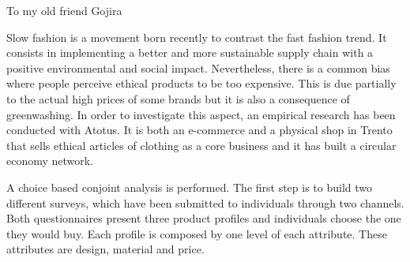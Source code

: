 \documentclass[%
    corpo=11pt,
    twoside, %
    oldstyle,
    autoretitolo,
    greek,
    evenboxes,
]{toptesi}
\begin{document}



  

\frontespizio %


\begin{dedica}
	To my old friend Gojira
	
\end{dedica}
\paginavuota
\sommario 

Slow fashion is a movement born recently to contrast the fast fashion trend. It consists in implementing a better and more sustainable supply chain with a positive environmental and social impact. Nevertheless, there is a common bias where people perceive ethical products to be too expensive. This is due partially to the actual high prices of some brands but it is also a consequence of greenwashing. In order to investigate this aspect, an empirical research has been conducted with Atotus.
It is both an e-commerce and a physical shop in Trento that sells ethical articles of clothing as a core business and it has built a circular economy network. 

A choice based conjoint analysis is performed. The first step is to build two different surveys, which have been submitted to individuals through two channels. Both questionnaires present three product profiles and individuals choose the one they would buy. Each profile is composed by one level of each attribute. These attributes are design, material and price.
\end{document}
